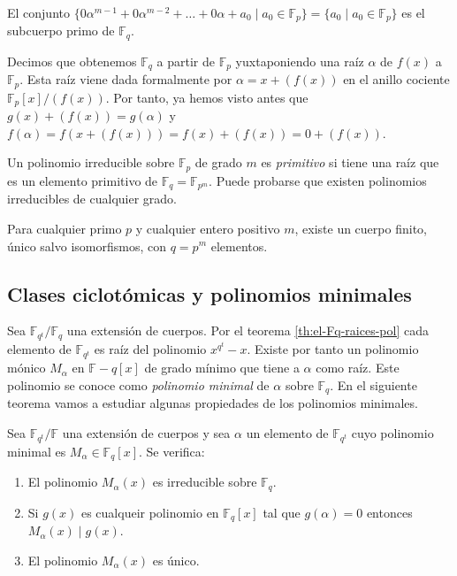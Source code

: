El conjunto \(\{0\alpha^{m-1} + 0\alpha^{m-2} + \dots + 0\alpha + a_0 \mid a_0 \in \mathbb F_p\} = \{a_0 \mid a_0 \in \mathbb F_p\}\) es el subcuerpo primo de \(\mathbb F_q\).

Decimos que obtenemos \(\mathbb F_q\) a partir de \(\mathbb F_p\) yuxtaponiendo una raíz \(\alpha\) de \(f(x)\) a \(\mathbb F_p\).
Esta raíz viene dada formalmente por \(\alpha = x + (f(x))\) en el anillo cociente \(\mathbb F_p[x]/(f(x))\).
Por tanto, ya hemos visto antes que \(g(x) + (f(x)) = g(\alpha)\) y \(f(\alpha) = f(x + (f(x))) = f(x) + (f(x)) = 0 + (f(x))\).

Un polinomio irreducible sobre \(\mathbb F_p\) de grado \(m\) es \textit{primitivo} si tiene una raíz que es un elemento primitivo de \(\mathbb F_q = \mathbb F_{p^m}\).
Puede probarse que existen polinomios irreducibles de cualquier grado.

\begin{theorem}
  Para cualquier primo \(p\) y cualquier entero positivo \(m\), existe un cuerpo finito, único salvo isomorfismos, con \(q = p^m\) elementos.
\end{theorem}


\subsection{Clases ciclotómicas y polinomios minimales}

Sea \(\mathbb F_{q^t}/\mathbb F_q\) una extensión de cuerpos.
Por el teorema \ref{th:el-Fq-raices-pol} cada elemento de \(\mathbb F_{q^t}\) es raíz del polinomio \(x^{q^t} - x\).
Existe por tanto un polinomio mónico \(M_{\alpha}\) en \(\mathbb F-q[x]\) de grado mínimo que tiene a \(\alpha\) como raíz.
Este polinomio se conoce como \textit{polinomio minimal} de \(\alpha\) sobre \(\mathbb F_q\).
En el siguiente teorema vamos a estudiar algunas propiedades de los polinomios minimales.

\begin{theorem}
  Sea \(\mathbb F_{q^t}/\mathbb F\) una extensión de cuerpos y sea \(\alpha\) un elemento de \(\mathbb F_{q^t}\) cuyo polinomio minimal es \(M_{\alpha} \in \mathbb F_q[x]\).
  Se verifica:
  \begin{enumerate}
    \item El polinomio \(M_{\alpha}(x)\) es irreducible sobre \(\mathbb F_q\).
    \item Si \(g(x)\) es cualqueir polinomio en \(\mathbb F_q[x]\) tal que \(g(\alpha) = 0\) entonces \(M_{\alpha}(x) \mid g(x)\).
    \item El polinomio \(M_{\alpha}(x)\) es único.
  \end{enumerate}
\end{theorem}

